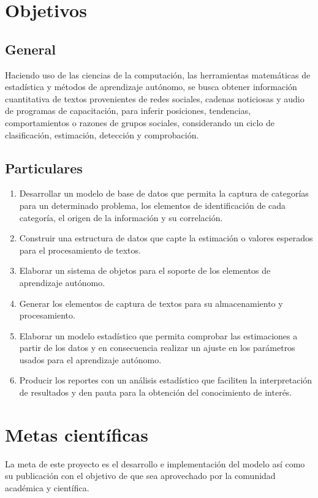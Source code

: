 \section {Objetivos}
\subsection {General}
Haciendo uso de las ciencias de la computación, las herramientas matemáticas de estadística y métodos de aprendizaje autónomo, se busca obtener información cuantitativa de textos provenientes de redes sociales, cadenas noticiosas y audio de programas de capacitación, para inferir posiciones, tendencias, comportamientos o razones de grupos sociales, considerando un ciclo de clasificación, estimación, detección y comprobación.
\subsection {Particulares}
\begin{enumerate}
    \item Desarrollar un modelo de base de datos que permita la captura de categorías para un determinado problema, los elementos de identificación de cada categoría, el origen de la información y su correlación.
    \item Construir una estructura de datos que capte la estimación o valores esperados para el procesamiento de textos.
    \item Elaborar un sistema de objetos para el soporte de los elementos de aprendizaje autónomo.
    \item Generar los elementos de captura de textos para su almacenamiento y procesamiento.
    \item Elaborar un modelo estadístico que permita comprobar las estimaciones a partir de los datos y en consecuencia realizar un ajuste en los parámetros usados para el aprendizaje autónomo.
    \item Producir los reportes con un análisis estadístico que faciliten la interpretación de resultados y den pauta para la obtención del conocimiento de interés.
\end{enumerate}
\section {Metas científicas}
La meta de este proyecto es el desarrollo e implementación del modelo así como su publicación con el objetivo de que sea aprovechado por la comunidad académica y científica.